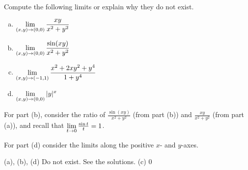 \begin{question}[M226 2007D] %
Compute the following limits or explain why they do not exist.
\begin{enumerate}[(a)]
\item $\displaystyle\lim_{(x,y)\rightarrow(0,0)}\frac{xy}{x^2+y^2}$
\item $\displaystyle\lim_{(x,y)\rightarrow(0,0)}\frac{\sin(xy)}{x^2+y^2}$
\item $\displaystyle\lim_{(x,y)\rightarrow(-1,1)}\frac{x^2+2xy^2+y^4}{1+y^4}$
\item $\displaystyle\lim_{(x,y)\rightarrow(0,0)}|y|^x$
\end{enumerate}
\end{question}

\begin{hint}
For part (b), consider the ratio of $\frac{\sin(xy)}{x^2+y^2}$
(from part (b)) and $\frac{xy}{x^2+y^2}$ (from part (a)), and recall that
$\displaystyle\lim_{t\rightarrow 0}\tfrac{\sin t}{t}=1$.

For part (d) consider the limits along the positive $x$- and $y$-axes.
\end{hint}

\begin{answer}
(a), (b), (d) Do not exist. See the solutions.\qquad
(c) $0$
\end{answer}

